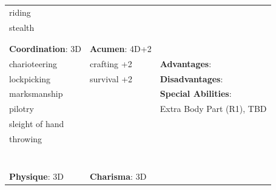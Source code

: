 \documentclass[10pt]{article}
\begin{document}
\begin{table}
\begin{tabular}{m{156pt} m{156pt} m{156pt}}
riding               \hrulefill &  \hrulefill & \\

stealth              \hrulefill &  \hrulefill & \\

 \hrulefill &  \hrulefill & \\

 \hrulefill &  \hrulefill & \\


\textbf{Coordination}: 3D \hrulefill & \textbf{Acumen}: 4D+2 \hrulefill     & \hrulefill \\

charioteering        \hrulefill & crafting          +2 \hrulefill & \textbf{Advantages}: \hrulefill \\

lockpicking          \hrulefill & survival          +2 \hrulefill & \textbf{Disadvantages}: \hrulefill \\

marksmanship         \hrulefill &  \hrulefill & \textbf{Special Abilities}: \hrulefill \\

pilotry              \hrulefill &  \hrulefill & Extra Body Part (R1), TBD \hrulefill \\

sleight of hand      \hrulefill &  \hrulefill &  \hrulefill \\

throwing             \hrulefill &  \hrulefill &  \hrulefill \\

 \hrulefill &  \hrulefill &  \hrulefill \\

 \hrulefill &  \hrulefill &  \hrulefill \\

 \hrulefill &  \hrulefill &  \hrulefill \\

 \hrulefill &  \hrulefill &  \hrulefill \\

 \hrulefill &  \hrulefill &  \hrulefill \\

 \hrulefill &  \hrulefill &  \hrulefill \\

 \hrulefill &  \hrulefill &  \hrulefill \\


\textbf{Physique}: 3D \hrulefill & \textbf{Charisma}: 3D \hrulefill     &  \hrulefill \\


\end{tabular}
\end{table}
\end{document}
